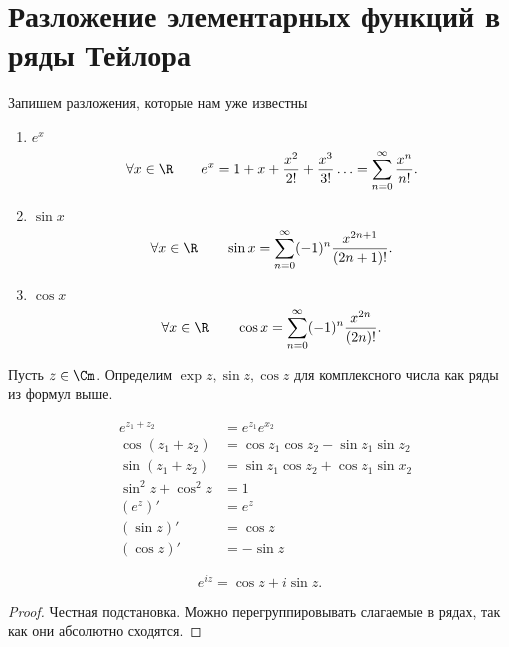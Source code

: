 \section{Разложение элементарных функций в ряды Тейлора}
Запишем разложения, которые нам уже известны
\begin{enumerate}
    \item $ e^{x}$
		\[
			\forall x \in \R \qquad e^{x} = 1 + x + \frac{x^2}{2!} + \frac{x^3}{3!}\ldots = \sum_{n=0}^{\infty} \frac{x^{n}}{n!}
    .\] 
\item $ \sin x$ 
	\[
		\forall x \in \R \qquad \sin x = \sum_{n=0}^{\infty} (-1)^{n} \frac{x^{2n+1}}{(2n+1)!}
	.\] 
\item $ \cos x$ 
	\[
		\forall x \in \R \qquad \cos x =\sum_{n=0}^{\infty} (-1)^{n} \frac{x^{2n}}{(2n)!}
	.\] 
\end{enumerate} 
\begin{defn}
    Пусть $ z \in \Cm$. Определим $ \exp z, \sin z, \cos z$ для комплексного числа как ряды из формул выше.
\end{defn}
\begin{prac}
    \[
    \begin{aligned}
		&e^{z_1 + z_2}  &= e^{z_1} e^{x_2} \\
		&\cos(z_1 + z_2) &= \cos z_1 \cos z_2 - \sin z_1 \sin z_2 \\
		&\sin (z_1 + z_2) &= \sin z_1 \cos z_2 + \cos z_1 \sin x_2 \\
		&\sin ^2 z + \cos^2 z &= 1 \\
		&(e ^{z})' &= e^{z} \\
		&(\sin z)' &= \cos z \\
		&(\cos z)' &= - \sin z
    \end{aligned}
    \] 
\end{prac}
\begin{thm}
    \[
    e^{iz} = \cos z + i \sin z
    .\] 
\end{thm}
\begin{proof}
    Честная подстановка. Можно перегруппировывать слагаемые в рядах, так как они абсолютно сходятся.
\end{proof}
